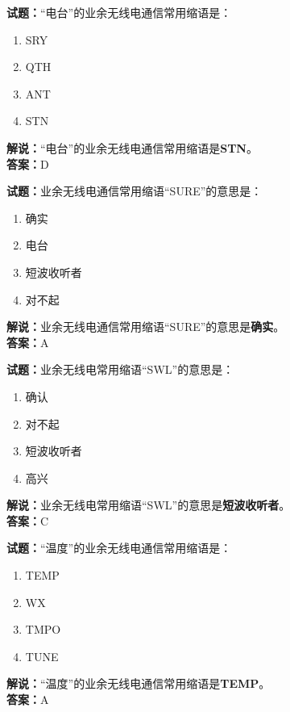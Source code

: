 \documentclass{ctexbook}
\begin{document}
\vspace{1em}

\textbf{试题：}“电台”的业余无线电通信常用缩语是：
\begin{enumerate}[leftmargin=3em]
  \item SRY
  \item QTH
  \item ANT
  \item STN
\end{enumerate}
\noindent\textbf{解说：}“电台”的业余无线电通信常用缩语是\textbf{STN}。\\\noindent\textbf{答案：}D

\vspace{1em}

\textbf{试题：}业余无线电通信常用缩语“SURE”的意思是：
\begin{enumerate}[leftmargin=3em]
  \item 确实
  \item 电台
  \item 短波收听者
  \item 对不起
\end{enumerate}
\noindent\textbf{解说：}业余无线电通信常用缩语“SURE”的意思是\textbf{确实}。\\\noindent\textbf{答案：}A

\vspace{1em}

\textbf{试题：}业余无线电常用缩语“SWL”的意思是：
\begin{enumerate}[leftmargin=3em]
  \item 确认
  \item 对不起
  \item 短波收听者
  \item 高兴
\end{enumerate}
\noindent\textbf{解说：}业余无线电常用缩语“SWL”的意思是\textbf{短波收听者}。\\\noindent\textbf{答案：}C

\vspace{1em}

\textbf{试题：}“温度”的业余无线电通信常用缩语是：
\begin{enumerate}[leftmargin=3em]
  \item TEMP
  \item WX
  \item TMPO
  \item TUNE
\end{enumerate}
\noindent\textbf{解说：}“温度”的业余无线电通信常用缩语是\textbf{TEMP}。\\\noindent\textbf{答案：}A
\end{document}
